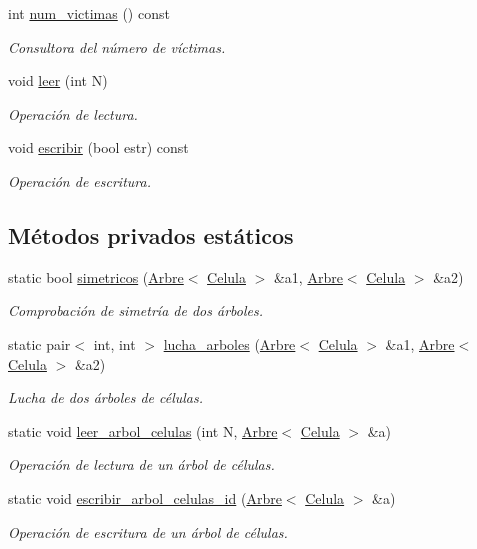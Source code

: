\begin{DoxyCompactItemize}
int \hyperlink{class_organismo_aadcc0750f9405e7334ac6a69e4ebb1b8}{num\+\_\+victimas} () const 
\begin{DoxyCompactList}\small\item\em Consultora del número de víctimas. \end{DoxyCompactList}\item 
void \hyperlink{class_organismo_a189d611401e25f603103c420d0b62e23}{leer} (int N)
\begin{DoxyCompactList}\small\item\em Operación de lectura. \end{DoxyCompactList}\item 
void \hyperlink{class_organismo_aaa66fa8430c7413c3960472961721b8b}{escribir} (bool estr) const 
\begin{DoxyCompactList}\small\item\em Operación de escritura. \end{DoxyCompactList}\end{DoxyCompactItemize}
\subsection*{Métodos privados estáticos}
\begin{DoxyCompactItemize}
\item 
static bool \hyperlink{class_organismo_ac483b268b68eed06f612ed690c22af8f}{simetricos} (\hyperlink{class_arbre}{Arbre}$<$ \hyperlink{class_celula}{Celula} $>$ \&a1, \hyperlink{class_arbre}{Arbre}$<$ \hyperlink{class_celula}{Celula} $>$ \&a2)
\begin{DoxyCompactList}\small\item\em Comprobación de simetría de dos árboles. \end{DoxyCompactList}\item 
static pair$<$ int, int $>$ \hyperlink{class_organismo_aaf643a47840f855ed3e105970f75a078}{lucha\+\_\+arboles} (\hyperlink{class_arbre}{Arbre}$<$ \hyperlink{class_celula}{Celula} $>$ \&a1, \hyperlink{class_arbre}{Arbre}$<$ \hyperlink{class_celula}{Celula} $>$ \&a2)
\begin{DoxyCompactList}\small\item\em Lucha de dos árboles de células. \end{DoxyCompactList}\item 
static void \hyperlink{class_organismo_abf016c166b00ca0f7016afd44d282913}{leer\+\_\+arbol\+\_\+celulas} (int N, \hyperlink{class_arbre}{Arbre}$<$ \hyperlink{class_celula}{Celula} $>$ \&a)
\begin{DoxyCompactList}\small\item\em Operación de lectura de un árbol de células. \end{DoxyCompactList}\item 
static void \hyperlink{class_organismo_ad29f7f44a5694136d0a3990581426cf0}{escribir\+\_\+arbol\+\_\+celulas\+\_\+id} (\hyperlink{class_arbre}{Arbre}$<$ \hyperlink{class_celula}{Celula} $>$ \&a)
\begin{DoxyCompactList}\small\item\em Operación de escritura de un árbol de células. \end{DoxyCompactList}\end{DoxyCompactItemize}
